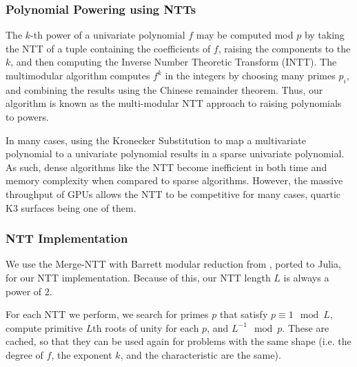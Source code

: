 \subsubsection{Polynomial Powering using NTTs}
The \(k\)-th power of a univariate polynomial \(f\)
may be computed mod \(p\) by taking the NTT 
of a tuple containing the coefficients of \(f\),
raising the components to the \(k\),
and then computing the Inverse Number Theoretic Transform (INTT).
The multimodular algorithm 
computes \(f^{k}\) in the integers by
choosing many primes \(p_{i}\), 
and combining the results using the Chinese remainder theorem.
Thus, our algorithm is known as the 
multi-modular NTT approach to raising polynomials to powers.

In many cases, using the Kronecker Substitution to 
map a multivariate polynomial to a univariate polynomial results in 
a sparse univariate polynomial. As such, dense 
algorithms like the NTT become inefficient in both 
time and memory complexity when compared to sparse algorithms.
However, the massive throughput of GPUs allows the 
NTT to be competitive for many cases, 
quartic K3 surfaces being one of them.

\subsubsection{NTT Implementation}

We use the Merge-NTT with Barrett modular reduction from \cite{ozcan-2023-fft}, 
ported to Julia, for our NTT implementation. 
Because of this, our NTT length $L$ is always a power of $2$. 

For each NTT we perform, we search for primes $p$ that satisfy 
$p \equiv 1 \mod L$, compute primitive $L$th roots of unity 
for each $p$, and $L^{-1} \mod p$. 
These are cached, so that they can be used again for problems with the same shape 
(i.e. the degree of \(f\), the exponent \(k\), and the characteristic are the same).


